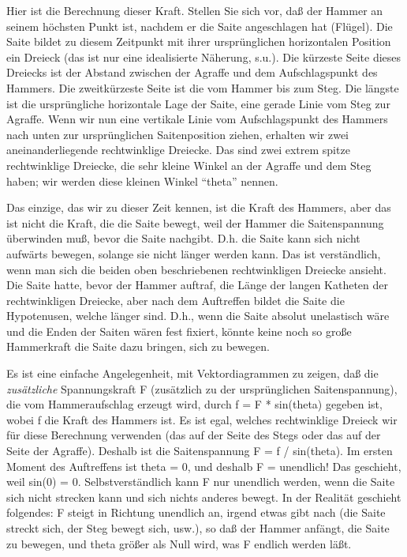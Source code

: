 Hier ist die Berechnung dieser Kraft.
Stellen Sie sich vor, daß der Hammer an seinem höchsten Punkt ist, nachdem er die Saite angeschlagen hat (Flügel).
Die Saite bildet zu diesem Zeitpunkt mit ihrer ursprünglichen horizontalen Position ein Dreieck (das ist nur eine idealisierte Näherung, s.u.).
Die kürzeste Seite dieses Dreiecks ist der Abstand zwischen der Agraffe und dem Aufschlagspunkt des Hammers.
Die zweitkürzeste Seite ist die vom Hammer bis zum Steg.
Die längste ist die ursprüngliche horizontale Lage der Saite, eine gerade Linie vom Steg zur Agraffe.
Wenn wir nun eine vertikale Linie vom Aufschlagspunkt des Hammers nach unten zur ursprünglichen Saitenposition ziehen, erhalten wir zwei aneinanderliegende rechtwinklige Dreiecke.
Das sind zwei extrem spitze rechtwinklige Dreiecke, die sehr kleine Winkel an der Agraffe und dem Steg haben; wir werden diese kleinen Winkel \enquote{theta} nennen.

Das einzige, das wir zu dieser Zeit kennen, ist die Kraft des Hammers, aber das ist nicht die Kraft, die die Saite bewegt, weil der Hammer die Saitenspannung überwinden muß, bevor die Saite nachgibt.
D.h. die Saite kann sich nicht aufwärts bewegen, solange sie nicht länger werden kann.
Das ist verständlich, wenn man sich die beiden oben beschriebenen rechtwinkligen Dreiecke ansieht.
Die Saite hatte, bevor der Hammer auftraf, die Länge der langen Katheten der rechtwinkligen Dreiecke, aber nach dem Auftreffen bildet die Saite die Hypotenusen, welche länger sind.
D.h., wenn die Saite absolut unelastisch wäre und die Enden der Saiten wären fest fixiert, könnte keine noch so große Hammerkraft die Saite dazu bringen, sich zu bewegen.

Es ist eine einfache Angelegenheit, mit Vektordiagrammen zu zeigen, daß die \textit{zusätzliche} Spannungskraft F (zusätzlich zu der ursprünglichen Saitenspannung), die vom Hammeraufschlag erzeugt wird, durch f = F * sin(theta) gegeben ist, wobei f die Kraft des Hammers ist.
Es ist egal, welches rechtwinklige Dreieck wir für diese Berechnung verwenden (das auf der Seite des Stegs oder das auf der Seite der Agraffe).
Deshalb ist die Saitenspannung F = f / sin(theta).
Im ersten Moment des Auftreffens ist theta = 0, und deshalb F = unendlich!
Das geschieht, weil sin(0) = 0.
Selbstverständlich kann F nur unendlich werden, wenn die Saite sich nicht strecken kann und sich nichts anderes bewegt.
In der Realität geschieht folgendes: F steigt in Richtung unendlich an, irgend etwas gibt nach (die Saite streckt sich, der Steg bewegt sich, usw.), so daß der Hammer anfängt, die Saite zu bewegen, und theta größer als Null wird, was F endlich werden läßt.

